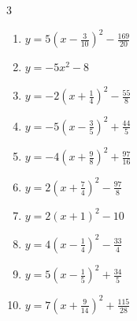 \begin{multicols}{3}
\begin{enumerate}
  \item $\displaystyle y=5\left( x-\frac{3}{10}\right)^{2}-\frac{169}{20}$


\columnbreak %

  \item $\displaystyle y=-5x^{2}-8$

        \phantom{$\displaystyle 頂点\left( 0 , -8 \right)$}

  \item $\displaystyle y=-2\left( x+\frac{1}{4}\right)^{2}-\frac{55}{8}$


  \item $\displaystyle y=-5\left( x-\frac{3}{5}\right)^{2}+\frac{44}{5}$


  \item $\displaystyle y=-4\left( x+\frac{9}{8}\right)^{2}+\frac{97}{16}$


  \item $\displaystyle y=2\left( x+\frac{7}{4}\right)^{2}-\frac{97}{8}$


  \item $\displaystyle y=2\left( x+1\right)^{2}-10$

        \phantom{$\displaystyle 頂点\left( -1 , -10 \right)$}

  \item $\displaystyle y=4\left( x-\frac{1}{4}\right)^{2}-\frac{33}{4}$


  \item $\displaystyle y=5\left( x-\frac{1}{5}\right)^{2}+\frac{34}{5}$


  \item $\displaystyle y=7\left( x+\frac{9}{14}\right)^{2}+\frac{115}{28}$


\end{enumerate}
\end{multicols}
